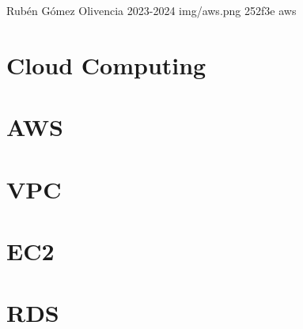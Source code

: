 \documentclass{\ClassPath/yukibook}
\begin{document}
    {Rubén Gómez Olivencia}  %
    {2023-2024}    %
    {} %
    {} %
    {} %
    {img/aws.png} %
    {252f3e}
    {aws} %

    \coverpage
    \graphicspath{{../../yukibook.cls/}}
    \licensepage

    \tableofcontents

    \graphicspath{{img/}}

    \part{Cloud Computing}
    
    
    \part{AWS}
    
    
    \part{VPC}
    

    \part{EC2}
    
    
    \part{RDS}
    
\end{document}
